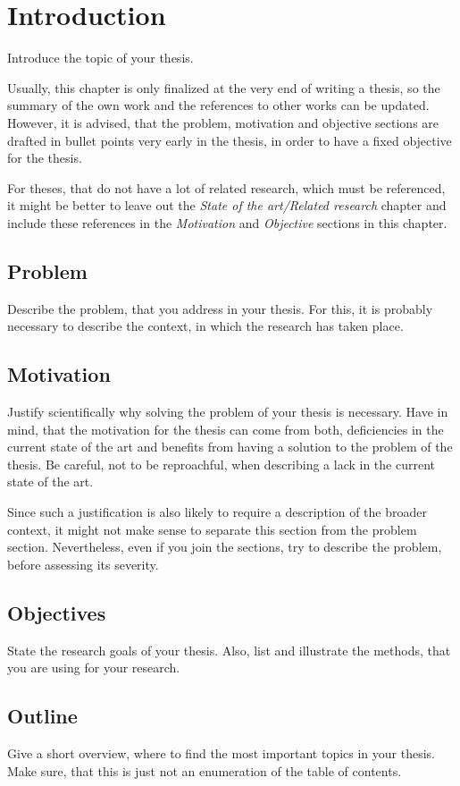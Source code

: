 \chapter{Introduction}

Introduce the topic of your thesis.

Usually, this chapter is only finalized at the very end of writing a thesis, so the summary of the own work and the references to other works can be updated.
However, it is advised, that the problem, motivation and objective sections are drafted in bullet points very early in the thesis, in order to have a fixed objective for the thesis.

For theses, that do not have a lot of related research, which must be referenced, it might be better to leave out the \textit{State of the art/Related research} chapter and include these references in the \textit{Motivation} and \textit{Objective} sections in this chapter.

\section{Problem}

Describe the problem, that you address in your thesis.
For this, it is probably necessary to describe the context, in which the research has taken place.

\section{Motivation}

Justify scientifically why solving the problem of your thesis is necessary.
Have in mind, that the motivation for the thesis can come from both, deficiencies in the current state of the art and benefits from having a solution to the problem of the thesis.
Be careful, not to be reproachful, when describing a lack in the current state of the art.

Since such a justification is also likely to require a description of the broader context, it might not make sense to separate this section from the problem section.
Nevertheless, even if you join the sections, try to describe the problem, before assessing its severity.

\section{Objectives}

State the research goals of your thesis.
Also, list and illustrate the methods, that you are using for your research.

\section{Outline}

Give a short overview, where to find the most important topics in your thesis.
Make sure, that this is just not an enumeration of the table of contents.

